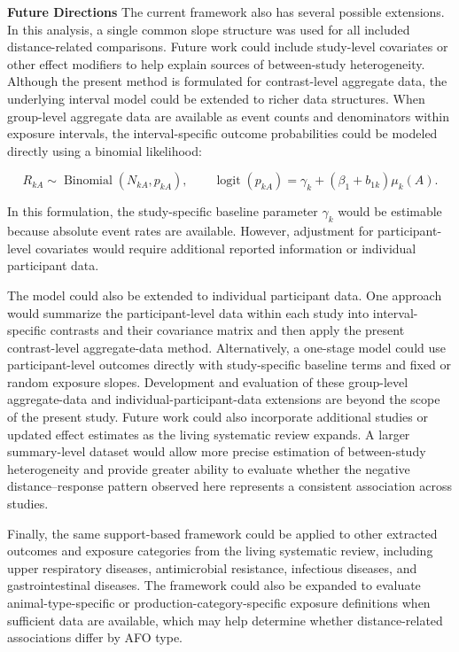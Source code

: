 \documentclass[journal=rsm]{CUP-JNL-DTM}%
\theoremstyle{definition}
\numberwithin{equation}{section}
\begin{document}
\noindent\textbf{Future Directions} The current framework also has several possible extensions. In this analysis, a single common slope structure was used for all included distance-related comparisons. Future work could include study-level covariates or other effect modifiers to help explain sources of between-study heterogeneity. Although the present method is formulated for contrast-level aggregate data,
the underlying interval model could be extended to richer data structures.
When group-level aggregate data are available as event counts and
denominators within exposure intervals, the interval-specific outcome
probabilities could be modeled directly using a binomial likelihood:

\[
R_{kA}\sim\operatorname{Binomial}(N_{kA},p_{kA}),
\qquad
\operatorname{logit}(p_{kA})
=
\gamma_k+(\beta_1+b_{1k})\mu_k(A).
\]

In this formulation, the study-specific baseline parameter $\gamma_k$ would
be estimable because absolute event rates are available. However, adjustment
for participant-level covariates would require additional reported
information or individual participant data.

The model could also be extended to individual participant data. One
approach would summarize the participant-level data within each study into
interval-specific contrasts and their covariance matrix and then apply the
present contrast-level aggregate-data method. Alternatively, a one-stage
model could use participant-level outcomes directly with study-specific
baseline terms and fixed or random exposure slopes. Development and
evaluation of these group-level aggregate-data and individual-participant-data
extensions are beyond the scope of the present study. Future work could also incorporate additional studies or updated effect estimates as the living systematic review expands. A larger summary-level dataset would allow more precise estimation of between-study heterogeneity and provide greater ability to evaluate whether the negative distance--response pattern observed here represents a consistent association across studies.

Finally, the same support-based framework could be applied to other extracted outcomes and exposure categories from the living systematic review, including upper respiratory diseases, antimicrobial resistance, infectious diseases, and gastrointestinal diseases. The framework could also be expanded to evaluate animal-type-specific or production-category-specific exposure definitions when sufficient data are available, which may help determine whether distance-related associations differ by AFO type.
\end{document}
